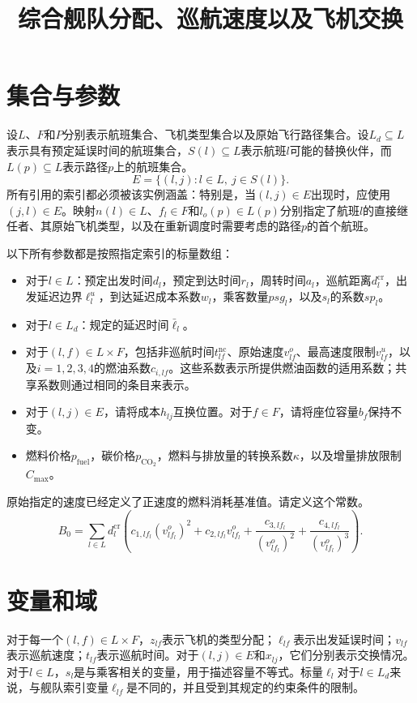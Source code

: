 \documentclass{article}
\title{综合舰队分配、巡航速度以及飞机交换}
\date{}
\begin{document}
\maketitle

\section{集合与参数}
设$L$、$F$和$P$分别表示航班集合、飞机类型集合以及原始飞行路径集合。设$L_d\subseteq L$表示具有预定延误时间的航班集合，$S(l)\subseteq L$表示航班$l$可能的替换伙伴，而$L(p)\subseteq L$表示路径$p$上的航班集合。
\[
 E=\{(l,j):l\in L,\ j\in S(l)\}.
\]
所有引用的索引都必须被该实例涵盖：特别是，当$(l,j)\in E$出现时，应使用$(j,l)\in E$。映射$n(l)\in L$、$f_l\in F$和$l_o(p)\in L(p)$分别指定了航班$l$的直接继任者、其原始飞机类型，以及在重新调度时需要考虑的路径$p$的首个航班。

以下所有参数都是按照指定索引的标量数组：
\begin{itemize}
\item 对于$l\in L$：预定出发时间$d_l$，预定到达时间$r_l$，周转时间$a_l$，巡航距离$d_l^{\mathrm{cr}}$，出发延迟边界$\ell_l^u$，到达延迟成本系数$w_l$，乘客数量$psg_l$，以及$s_l$的系数$sp_l$。
\item 对于$l\in L_d$：规定的延迟时间$\bar\ell_l$。
\item 对于$(l,f)\in L\times F$，包括非巡航时间$t_{lf}^{\mathrm{nc}}$、原始速度$v_{lf}^{o}$、最高速度限制$v_{lf}^{u}$，以及$i=1,2,3,4$的燃油系数$c_{i,lf}$。这些系数表示所提供燃油函数的适用系数；共享系数则通过相同的条目来表示。
\item 对于$(l,j)\in E$，请将成本$h_{lj}$互换位置。对于$f\in F$，请将座位容量$b_f$保持不变。
\item 燃料价格$p_{\mathrm{fuel}}$，碳价格$p_{\mathrm{CO}_2}$，燃料与排放量的转换系数$\kappa$，以及增量排放限制$C_{\max}$。
\end{itemize}
原始指定的速度已经定义了正速度的燃料消耗基准值。请定义这个常数。
\[
 B_0=\sum_{l\in L}d_l^{\mathrm{cr}}\left(
 c_{1,l f_l}(v_{l f_l}^{o})^2+c_{2,l f_l}v_{l f_l}^{o}
 +\frac{c_{3,l f_l}}{(v_{l f_l}^{o})^2}
 +\frac{c_{4,l f_l}}{(v_{l f_l}^{o})^3}\right).
\]

\section{变量和域}
对于每一个$(l,f)\in L\times F$，$z_{lf}$表示飞机的类型分配；$\ell_{lf}$表示出发延误时间；$v_{lf}$表示巡航速度；$t_{lf}$表示巡航时间。对于$(l,j)\in E$和$x_{lj}$，它们分别表示交换情况。对于$l\in L$，$s_l$是与乘客相关的变量，用于描述容量不等式。标量$\ell_l$对于$l\in L_d$来说，与舰队索引变量$\ell_{lf}$是不同的，并且受到其规定的约束条件的限制。
\end{document}
